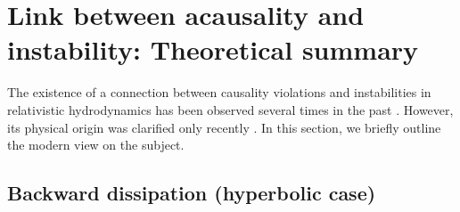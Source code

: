 \documentclass[aps, prd, showkeys,superscriptaddress, nofootinbib,floatfix]{revtex4-2}
\begin{document}
\section{Link between acausality and instability: Theoretical summary}
\label{sec:th-sumry}

The existence of a connection between causality violations and instabilities in relativistic hydrodynamics has been observed several times in the past \cite{Hishcock1983,Israel_2009_inbook,Pu:2009fj,Bemfica:2020zjp}. However, its physical origin was clarified only recently \cite{Gavassino:2021kjm,Gavassino:2021owo}. In this section, we briefly outline the modern view on the subject.






%
\vspace{-0.2cm}
\subsection{Backward dissipation (hyperbolic case)}\label{hy1}
\vspace{-0.2cm}
\end{document}
